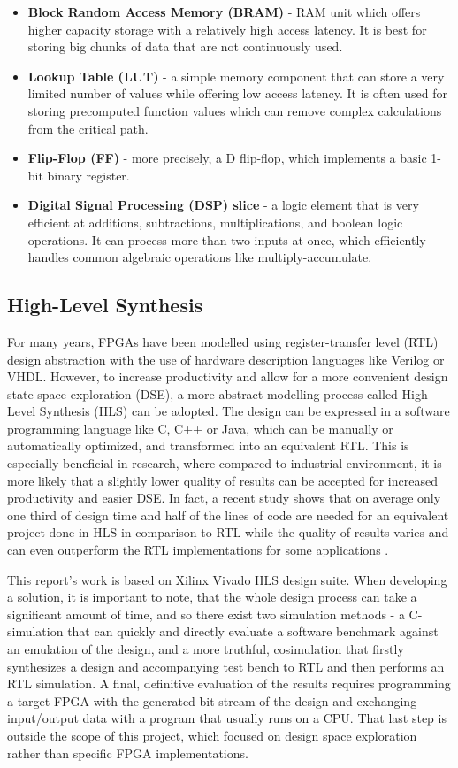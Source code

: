 \begin{itemize}
  \item \textbf{Block Random Access Memory (BRAM)} - RAM unit which offers higher capacity storage with a relatively high access latency. It is best for storing big chunks of data that are not continuously used.
  \item \textbf{Lookup Table (LUT)} - a simple memory component that can store a very limited number of values while offering low access latency. It is often used for storing precomputed function values which can remove complex calculations from the critical path.
  \item \textbf{Flip-Flop (FF)} - more precisely, a D flip-flop, which implements a basic 1-bit binary register.
  \item \textbf{Digital Signal Processing (DSP) slice} - a logic element that is very efficient at additions, subtractions, multiplications, and boolean logic operations. It can process more than two inputs at once, which efficiently handles common algebraic operations like multiply-accumulate.
\end{itemize}

\subsection{High-Level Synthesis}
For many years, FPGAs have been modelled using register-transfer level (RTL) design abstraction with the use of hardware description languages like Verilog or VHDL. However, to increase productivity and allow for a more convenient design state space exploration (DSE), a more abstract modelling process called High-Level Synthesis (HLS) can be adopted. The design can be expressed in a software programming language like C, C++ or Java, which can be manually or automatically optimized, and transformed into an equivalent RTL. This is especially beneficial in research, where compared to industrial environment, it is more likely that a slightly lower quality of results can be accepted for increased productivity and easier DSE. In fact, a recent study shows that on average only one third of design time and half of the lines of code are needed for an equivalent project done in HLS in comparison to RTL while the quality of results varies and can even outperform the RTL implementations for some applications \cite{30-lahti2019yet?}.

This report's work is based on Xilinx Vivado HLS design suite. When developing a solution, it is important to note, that the whole design process can take a significant amount of time, and so there exist two simulation methods - a C-simulation that can quickly and directly evaluate a software benchmark against an emulation of the design, and a more truthful, cosimulation that firstly synthesizes a design and accompanying test bench to RTL and then performs an RTL simulation. A final, definitive evaluation of the results requires programming a target FPGA with the generated bit stream of the design and exchanging input/output data with a program that usually runs on a CPU. That last step is outside the scope of this project, which focused on design space exploration rather than specific FPGA implementations.


